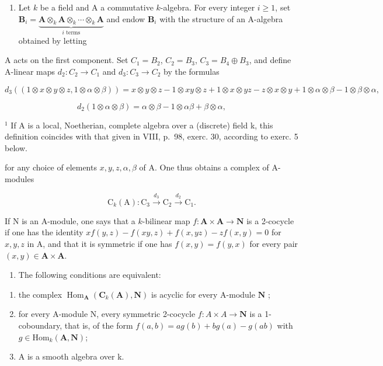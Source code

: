 \begin{enumerate}
\def\labelenumi{\arabic{enumi})}
\setcounter{enumi}{2}
\tightlist
\item
  Let \(k\) be a field and A a commutative \(k\)-algebra. For every integer \(i \geqslant 1\), set \(\mathbf{B}_i = \underbrace{\mathbf{A} \otimes_k \mathbf{A} \otimes_k \cdots \otimes_k \mathbf{A}}_{i \text{ terms}}\) and endow \(\mathbf{B}_i\) with the structure of an A-algebra obtained by letting
\end{enumerate}

A acts on the first component. Set \(C_{1} = B_{2}\), \(C_{2} = B_{3}\), \(C_{3} = B_{4} \oplus B_{3}\), and define A-linear maps \(d_{2}:C_{2} \to C_{1}\) and \(d_{3}:C_{3} \to C_{2}\) by the formulas

\[
d _ {3} ((1 \otimes x \otimes y \otimes z, 1 \otimes \alpha \otimes \beta)) = x \otimes y \otimes z - 1 \otimes x y \otimes z + 1 \otimes x \otimes y z - z \otimes x \otimes y + 1 \otimes \alpha \otimes \beta - 1 \otimes \beta \otimes \alpha,
\]

\[
d _ {2} (1 \otimes \alpha \otimes \beta) = \alpha \otimes \beta - 1 \otimes \alpha \beta + \beta \otimes \alpha ,
\]

\(^{1}\) If A is a local, Noetherian, complete algebra over a (discrete) field k, this definition coincides with that given in VIII, p.~98, exerc. 30, according to exerc. 5 below.

for any choice of elements \(x, y, z, \alpha, \beta\) of A. One thus obtains a complex of A-modules

\[
\mathrm{C} _ {k} (\mathrm{A}): \mathrm{C} _ {3} \xrightarrow {d _ {3}} \mathrm{C} _ {2} \xrightarrow {d _ {2}} \mathrm{C} _ {1}.
\]

If N is an A-module, one says that a \(k\)-bilinear map \(f: \mathbf{A} \times \mathbf{A} \to \mathbf{N}\) is a 2-cocycle if one has the identity \(xf(y, z) - f(xy, z) + f(x, yz) - zf(x, y) = 0\) for \(x, y, z\) in A, and that it is symmetric if one has \(f(x, y) = f(y, x)\) for every pair \((x, y) \in \mathbf{A} \times \mathbf{A}\).

\begin{enumerate}
\def\labelenumi{\alph{enumi})}
\tightlist
\item
  The following conditions are equivalent:
\end{enumerate}

\begin{enumerate}
\def\labelenumi{(\roman{enumi})}
\item
  the complex \(\operatorname{Hom}_{\mathbf{A}}(\mathbf{C}_k(\mathbf{A}), \mathbf{N})\) is acyclic for every A-module \(\mathbf{N}\) ;
\item
  for every A-module N, every symmetric 2-cocycle \(f:A\times A\to\mathbf{N}\) is a 1-coboundary, that is, of the form \(f(a,b)=ag(b)+bg(a)-g(ab)\) with \(g\in\mathrm{Hom}_{k}(\mathbf{A},\mathbf{N})\);
\item
  A is a smooth algebra over k.
\end{enumerate}

